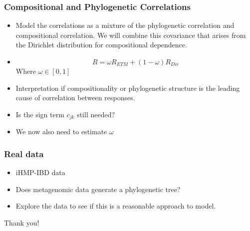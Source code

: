 \documentclass{beamer}
\begin{document}
\begin{frame}
\frametitle{Compositional and Phylogenetic Correlations}
\begin{itemize}
  \item Model the correlations as a mixture of the phylogenetic correlation and compositional correlation. We will combine this covariance that arises from the Dirichlet distribution for compositional dependence.
  \item
  $$R = \omega R_{ETM} + (1 - \omega) R_{Dir}$$
  Where $\omega \in [0,1]$
  \item Interpretation if compositionality or phylogenetic structure is the leading cause of correlation between responses.
  \item Is the sign term $c_{jk}$ still needed?
  \item We now also need to estimate $\omega$
\end{itemize}
\end{frame}

\begin{frame}
\frametitle{Real data}
\begin{itemize}
  \item iHMP-IBD data
  \item Does metagenomic data generate a phylogenetic tree?
  \item Explore the data to see if this is a reasonable approach to model.
\end{itemize}
\end{frame}


\begin{frame}
\Huge{\centerline{Thank you!}}
\end{frame}

\end{document}
